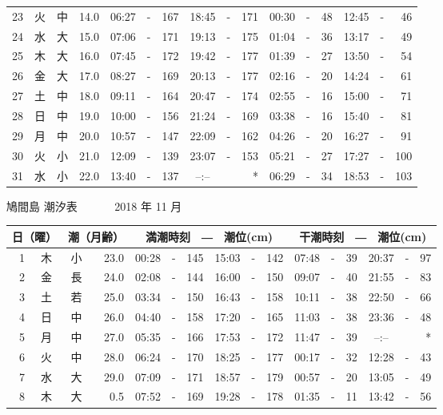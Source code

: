 \documentclass[12pt.a4j]{jsarticle}
\begin{document}
\begin{center}
\begin{table}[ht]
\begin{tabular}{|rc|cr|ccrccr|ccrccr|}
23 & 火 & 中 & 14.0 & 06:27 &-& 167 & 18:45 &-& 171 & 00:30 &-&  48 & 12:45 &-&  46 \\
24 & 水 & 大 & 15.0 & 07:06 &-& 171 & 19:13 &-& 175 & 01:04 &-&  36 & 13:17 &-&  49 \\
25 & 木 & 大 & 16.0 & 07:45 &-& 172 & 19:42 &-& 177 & 01:39 &-&  27 & 13:50 &-&  54 \\
26 & 金 & 大 & 17.0 & 08:27 &-& 169 & 20:13 &-& 177 & 02:16 &-&  20 & 14:24 &-&  61 \\
27 & 土 & 中 & 18.0 & 09:11 &-& 164 & 20:47 &-& 174 & 02:55 &-&  16 & 15:00 &-&  71 \\
28 & 日 & 中 & 19.0 & 10:00 &-& 156 & 21:24 &-& 169 & 03:38 &-&  16 & 15:40 &-&  81 \\
29 & 月 & 中 & 20.0 & 10:57 &-& 147 & 22:09 &-& 162 & 04:26 &-&  20 & 16:27 &-&  91 \\
30 & 火 & 小 & 21.0 & 12:09 &-& 139 & 23:07 &-& 153 & 05:21 &-&  27 & 17:27 &-& 100 \\
31 & 水 & 小 & 22.0 & 13:40 &-& 137 & --:-- & &  *  & 06:29 &-&  34 & 18:53 &-& 103 \\
\hline
\end{tabular}
\end{table}
\newpage
{\LARGE 鳩間島  潮汐表　　　}
{\large 2018 年 11 月}\\
\begin{table}[ht]
\begin{tabular}{|rc|cr|ccrccr|ccrccr|}
\hline
\multicolumn{2}{|c|}{日（曜）} & \multicolumn{2}{c|}{潮（月齢）} & \multicolumn{6}{c|}{満潮時刻　―　潮位(cm)} & \multicolumn{6}{c|}{干潮時刻　―　潮位(cm)} \\
\hline
 1 & 木 & 小 & 23.0 & 00:28 &-& 145 & 15:03 &-& 142 & 07:48 &-&  39 & 20:37 &-&  97 \\
 2 & 金 & 長 & 24.0 & 02:08 &-& 144 & 16:00 &-& 150 & 09:07 &-&  40 & 21:55 &-&  83 \\
 3 & 土 & 若 & 25.0 & 03:34 &-& 150 & 16:43 &-& 158 & 10:11 &-&  38 & 22:50 &-&  66 \\
 4 & 日 & 中 & 26.0 & 04:40 &-& 158 & 17:20 &-& 165 & 11:03 &-&  38 & 23:36 &-&  48 \\
 5 & 月 & 中 & 27.0 & 05:35 &-& 166 & 17:53 &-& 172 & 11:47 &-&  39 & --:-- & &  *  \\
 6 & 火 & 中 & 28.0 & 06:24 &-& 170 & 18:25 &-& 177 & 00:17 &-&  32 & 12:28 &-&  43 \\
 7 & 水 & 大 & 29.0 & 07:09 &-& 171 & 18:57 &-& 179 & 00:57 &-&  20 & 13:05 &-&  49 \\
 8 & 木 & 大 &  0.5 & 07:52 &-& 169 & 19:28 &-& 178 & 01:35 &-&  11 & 13:42 &-&  56 \\

\end{tabular}
\end{table}
\end{center}
\end{document}
